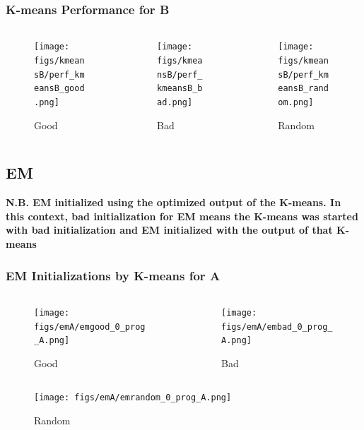 \documentclass[11pt]{beamer}
\begin{document}
\begin{frame}
\frametitle{K-means Performance for B}
\begin{columns}
\begin{column}{.3\textwidth}
\begin{figure}
  \texttt{[image: figs/kmeansB/perf\_kmeansB\_good.png]}
  \caption{Good}
\end{figure}
\end{column}
\begin{column}{.3\textwidth}
\begin{figure}
  \texttt{[image: figs/kmeansB/perf\_kmeansB\_bad.png]}
  \caption{Bad}
\end{figure}
\end{column}

\begin{column}{.3\textwidth}
\begin{figure}
  \texttt{[image: figs/kmeansB/perf\_kmeansB\_random.png]}
  \caption{Random}
\end{figure}
\end{column}

\end{columns}
\end{frame}

\subsection{EM}
\begin{frame}
\textbf{N.B. EM initialized using the optimized output of the K-means. In this context, bad initialization for EM means the K-means was
started with bad initialization and EM initialized with the output of that K-means}
\end{frame}

\begin{frame}
\frametitle{EM Initializations by K-means for A}
\begin{columns}[onlytextwidth]
\begin{column}{.45\textwidth}
\begin{figure}
  \texttt{[image: figs/emA/emgood\_0\_prog\_A.png]}
  \caption{Good}
\end{figure}
\end{column}
\hfill
\begin{column}{.45\textwidth}
\begin{figure}
  \texttt{[image: figs/emA/embad\_0\_prog\_A.png]}
  \caption{Bad}
\end{figure}
\end{column}
\end{columns}\vfill

\begin{figure}
  \texttt{[image: figs/emA/emrandom\_0\_prog\_A.png]}
  \caption{Random}
\end{figure}
\end{frame}
\end{document}

